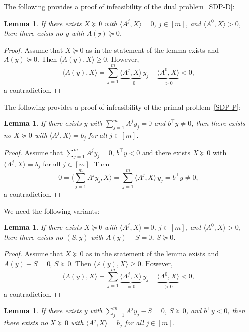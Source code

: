 \documentclass[10pt, a4paper]{article}
\newcommand{\skal}[2]{\langle{#1},{#2}\rangle}
\newcommand{\T}{^{\top}}
\newtheorem{lemma}[theorem]{Lemma}
\begin{document}
The following provides a proof of infeasibility of the dual problem~\eqref{SDP-D}:

\begin{lemma}\label{lemma:DualInfCertificate}
  If there exists $X \succeq 0$ with $\skal{A^j}{X} = 0$, $j \in [m]$, and
  $\skal{A^0}{X} > 0$, then there exists no $y$ with $A(y) \succeq 0$.
\end{lemma}

\begin{proof}
  Assume that $X \succeq 0$ as in the statement of the lemma exists and
  $A(y) \succeq 0$.  Then $\skal{A(y)}{X} \geq 0$. However,
  \[
  \skal{A(y)}{X} = \sum_{j=1}^m \underbrace{\skal{A^j}{X}}_{= 0}\, y_j -
  \underbrace{\skal{A^0}{X}}_{> 0} < 0,
  \]
  a contradiction.
\end{proof}

The following provides a proof of infeasibility of the primal problem~\eqref{SDP-P}:

\begin{lemma}\label{lemma:PrimalInfCertificate}
  If there exists $y$ with $\sum_{j=1}^m A^j y_j = 0$ and $b\T y \neq 0$, then
  there exists no $X \succeq 0$ with $\skal{A^j}{X} = b_j$ for all
  $j \in [m]$.
\end{lemma}

\begin{proof}
  Assume that $\sum_{j=1}^m A^j y_j = 0$, $b\T y < 0$ and there exists
  $X \succeq 0$ with $\skal{A^j}{X} = b_j$ for all $j \in [m]$. Then
  \[
  0 = \skal{\sum_{j=1}^m A^j y_j}{X} = \sum_{j=1}^m \skal{A^j}{X}\, y_j =
  b\T y \neq 0,
  \]
  a contradiction.
\end{proof}

We need the following variants:

\begin{lemma}\label{lemma:DualInfCertificate2}
  If there exists $X \succeq 0$ with $\skal{A^j}{X} = 0$, $j \in [m]$, and
  $\skal{A^0}{X} > 0$, then there exists no $(S,y)$ with $A(y) - S = 0$,
  $S \succeq 0$.
\end{lemma}

\begin{proof}
  Assume that $X \succeq 0$ as in the statement of the lemma exists and
  $A(y) - S = 0$, $S \succeq 0$.  Then $\skal{A(y)}{X} \geq 0$. However,
  \[
  \skal{A(y)}{X} = \sum_{j=1}^m \underbrace{\skal{A^j}{X}}_{= 0}\, y_j -
  \underbrace{\skal{A^0}{X}}_{> 0} < 0,
  \]
  a contradiction.
\end{proof}

\begin{lemma}\label{lemma:PrimalInfCertificate2}
  If there exists $y$ with $\sum_{j=1}^m A^j y_j - S = 0$, $S \succeq 0$,
  and $b\T y < 0$, then there exists no $X \succeq 0$ with
  $\skal{A^j}{X} = b_j$ for all $j \in [m]$.
\end{lemma}
\end{document}
